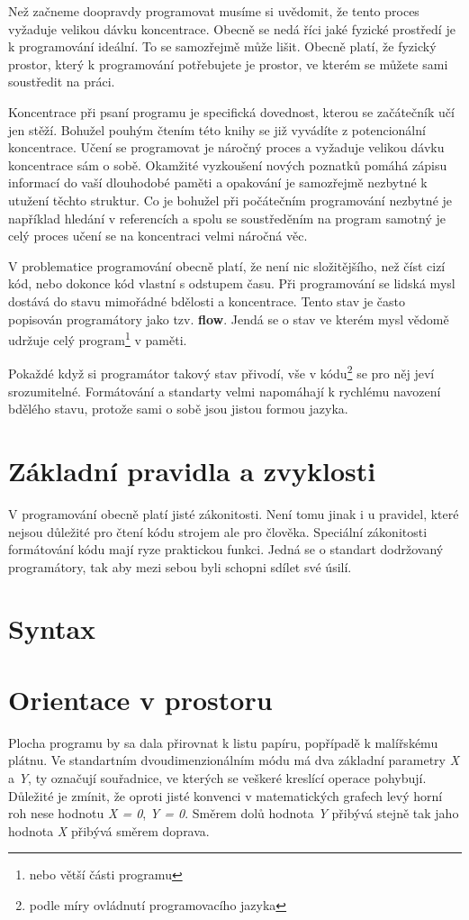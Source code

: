 \documentclass[12pt,twopage]{book}
\newcommand{\oddil}[1]{\section{#1}\label{sec:#1}}
\newcommand{\slovnik}[1]{\textbf{\gls{#1}}\index{#1}}
\begin{document}
Než začneme doopravdy programovat musíme si uvědomit, že tento proces vyžaduje velikou dávku koncentrace. Obecně se nedá říci jaké fyzické prostředí je k programování ideální. To se samozřejmě může lišit. Obecně platí, že fyzický prostor, který k programování potřebujete je prostor, ve kterém se můžete sami soustředit na práci.

Koncentrace při psaní programu je specifická dovednost, kterou se začátečník učí jen stěží. Bohužel pouhým čtením této knihy se již vyvádíte z potencionální koncentrace. Učení se programovat je náročný proces a vyžaduje velikou dávku koncentrace sám o sobě. Okamžité vyzkoušení nových poznatků pomáhá zápisu informací do vaší dlouhodobé paměti a opakování je samozřejmě nezbytné k utužení těchto struktur. Co je bohužel při počátečním programování nezbytné je například hledání v referencích a spolu se soustředěním na program samotný je celý proces učení se na koncentraci velmi náročná věc.



V problematice programování obecně platí, že není nic složitějšího, než číst cizí kód, nebo dokonce kód vlastní s odstupem času. Při programování se lidská mysl dostává do stavu mimořádné bdělosti a koncentrace. Tento stav je často popisován programátory jako tzv. \slovnik{flow}. Jendá se o stav ve kterém mysl vědomě udržuje celý program\footnote{nebo větší části programu} v paměti.

Pokaždé když si programátor takový stav přivodí, vše v kódu\footnote{podle míry ovládnutí programovacího jazyka} se pro něj jeví srozumitelné. Formátování a standarty velmi napomáhají k rychlému navození bdělého stavu, protože sami o sobě jsou jistou formou jazyka.

\oddil{Základní pravidla a zvyklosti}

V programování obecně platí jisté zákonitosti. Není tomu jinak i u pravidel, které nejsou důležité pro čtení kódu strojem ale pro člověka. Speciální zákonitosti formátování kódu mají ryze praktickou funkci. Jedná se o standart dodržovaný programátory, tak aby mezi sebou byli schopni sdílet své úsilí.


\oddil{Syntax}


\oddil{Orientace v prostoru}

Plocha programu by sa dala přirovnat k listu papíru, popřípadě k malířskému plátnu. Ve standartním dvoudimenzionálním módu má dva základní parametry {\em X} a {\em Y}, ty označují souřadnice, ve kterých se veškeré kreslící operace pohybují. Důležité je zmínit, že oproti jisté konvenci v matematických grafech levý horní roh nese hodnotu {\em X = 0}, {\em Y = 0}. Směrem dolů hodnota {\em Y} přibývá stejně tak jaho hodnota {\em X} přibývá směrem doprava.\\
\end{document}
